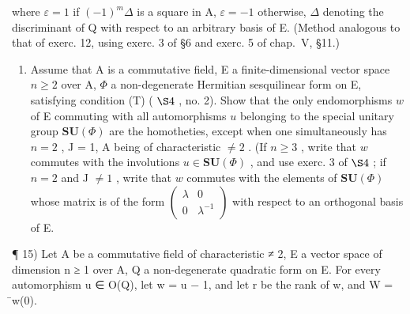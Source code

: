 where \(\varepsilon = 1\) if \((-1)^{m}\Delta\) is a square in A, \(\varepsilon = -1\) otherwise, \(\Delta\) denoting the discriminant of Q with respect to an arbitrary basis of E. (Method analogous to that of exerc. 12, using exerc. 3 of §6 and exerc. 5 of chap.~V, §11.)

\begin{enumerate}
\def\labelenumi{\arabic{enumi})}
\setcounter{enumi}{13}
\tightlist
\item
  Assume that A is a commutative field, E a finite-dimensional vector space \(n \geqslant 2\) over A, \(\Phi\) a non-degenerate Hermitian sesquilinear form on E, satisfying condition (T) ( \(\S 4\) , no. 2). Show that the only endomorphisms \(w\) of E commuting with all automorphisms \(u\) belonging to the special unitary group \(\mathbf{SU}(\Phi)\) are the homotheties, except when one simultaneously has \(n = 2\) , J = 1, A being of characteristic \(\neq 2\) . (If \(n \geqslant 3\) , write that \(w\) commutes with the involutions \(u \in \mathbf{SU}(\Phi)\) , and use exerc. 3 of \(\S 4\) ; if \(n = 2\) and J \(\neq 1\) , write that \(w\) commutes with the elements of \(\mathbf{SU}(\Phi)\) whose matrix is of the form \(\begin{pmatrix} \lambda & 0 \\ 0 & \lambda^{-1} \end{pmatrix}\) with respect to an orthogonal basis of E.
\end{enumerate}

¶ 15) Let A be a commutative field of characteristic ≠ 2, E a vector space of dimension n ≥ 1 over A, Q a non-degenerate quadratic form on E. For every automorphism u ∈ O(Q), let w = u − 1, and let r be the rank of w, and W = ̄w(0).

